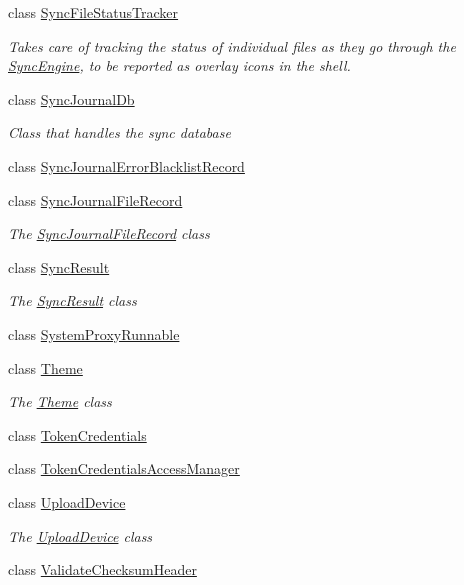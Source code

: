 \begin{DoxyCompactItemize}
class \hyperlink{class_o_c_c_1_1_sync_file_status_tracker}{Sync\+File\+Status\+Tracker}
\begin{DoxyCompactList}\small\item\em Takes care of tracking the status of individual files as they go through the \hyperlink{class_o_c_c_1_1_sync_engine}{Sync\+Engine}, to be reported as overlay icons in the shell. \end{DoxyCompactList}\item 
class \hyperlink{class_o_c_c_1_1_sync_journal_db}{Sync\+Journal\+Db}
\begin{DoxyCompactList}\small\item\em Class that handles the sync database \end{DoxyCompactList}\item 
class \hyperlink{class_o_c_c_1_1_sync_journal_error_blacklist_record}{Sync\+Journal\+Error\+Blacklist\+Record}
\item 
class \hyperlink{class_o_c_c_1_1_sync_journal_file_record}{Sync\+Journal\+File\+Record}
\begin{DoxyCompactList}\small\item\em The \hyperlink{class_o_c_c_1_1_sync_journal_file_record}{Sync\+Journal\+File\+Record} class \end{DoxyCompactList}\item 
class \hyperlink{class_o_c_c_1_1_sync_result}{Sync\+Result}
\begin{DoxyCompactList}\small\item\em The \hyperlink{class_o_c_c_1_1_sync_result}{Sync\+Result} class \end{DoxyCompactList}\item 
class \hyperlink{class_o_c_c_1_1_system_proxy_runnable}{System\+Proxy\+Runnable}
\item 
class \hyperlink{class_o_c_c_1_1_theme}{Theme}
\begin{DoxyCompactList}\small\item\em The \hyperlink{class_o_c_c_1_1_theme}{Theme} class \end{DoxyCompactList}\item 
class \hyperlink{class_o_c_c_1_1_token_credentials}{Token\+Credentials}
\item 
class \hyperlink{class_o_c_c_1_1_token_credentials_access_manager}{Token\+Credentials\+Access\+Manager}
\item 
class \hyperlink{class_o_c_c_1_1_upload_device}{Upload\+Device}
\begin{DoxyCompactList}\small\item\em The \hyperlink{class_o_c_c_1_1_upload_device}{Upload\+Device} class \end{DoxyCompactList}\item 
class \hyperlink{class_o_c_c_1_1_validate_checksum_header}{Validate\+Checksum\+Header}
\end{DoxyCompactItemize}
